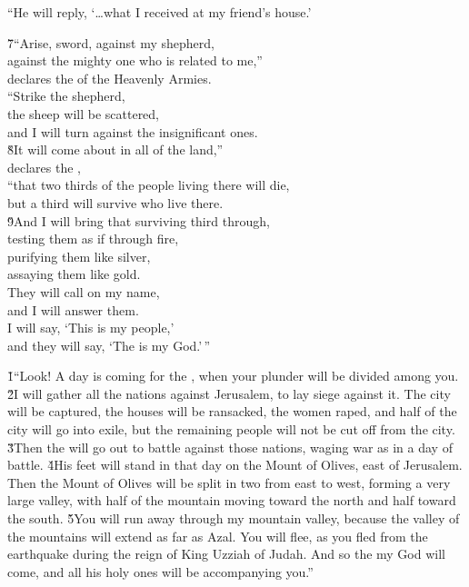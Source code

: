 ``He will reply, `{\ldots}what I received at my friend's house.'

\begin{poetry}
\poeml \v{7}``Arise, sword, against my shepherd, \\
\poemll    against the mighty one who is related to me,'' \\
\poemlll       declares the  of the Heavenly Armies. \\
\poeml ``Strike the shepherd, \\
\poemll    the sheep will be scattered, \\
\poemlll       and I will turn against the insignificant ones. \\
\poeml \v{8}It will come about in all of the land,'' \\
\poemll    declares the , \\
\poeml ``that two thirds of the people living there will die, \\
\poemll    but a third will survive who live there. \\
\poeml \v{9}And I will bring that surviving third through, \\
\poemll    testing them as if through fire, \\
\poeml purifying them like silver, \\
\poemll    assaying them like gold. \\
\poeml They will call on my name, \\
\poemll    and I will answer them. \\
\poeml I will say, `This is my people,' \\
\poemll    and they will say, `The  is my God.'\,''
\end{poetry}

\v{1}``Look! A day is coming for the , when your plunder will be divided among you. \v{2}I will gather all the nations against Jerusalem, to lay siege against it. The city will be captured, the houses will be ransacked, the women raped, and half of the city will go into exile, but the remaining people will not be cut off from the city. \v{3}Then the  will go out to battle against those nations, waging war as in a day of battle. \v{4}His feet will stand in that day on the Mount of Olives, east of Jerusalem. Then the Mount of Olives will be split in two from east to west, forming a very large valley, with half of the mountain moving toward the north and half toward the south. \v{5}You will run away through my mountain valley, because the valley of the mountains will extend as far as Azal. You will flee, as you fled from the earthquake during the reign of King Uzziah of Judah. And so the  my God will come, and all his holy ones will be accompanying you.''

